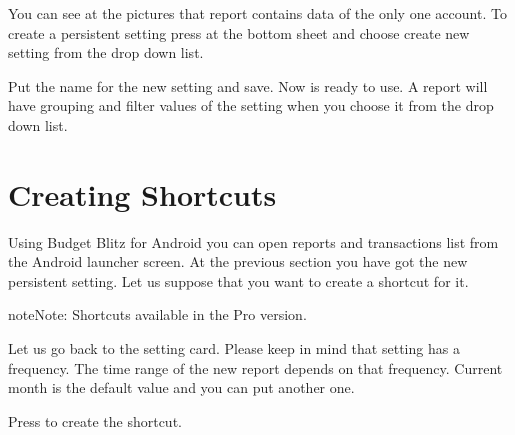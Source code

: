 \documentclass[a4paper,10pt,english]{sphinxmanual}
\begin{document}
\noindent{}
\noindent{}
\noindent{}

\sphinxAtStartPar
You can see at the pictures that report contains data of the only one account. To create
a persistent setting press  at the bottom sheet
and choose create new setting from the drop down list.

\noindent{}
\noindent{}
\noindent{}

\sphinxAtStartPar
Put the name  for the new setting and save. Now
 is ready to use. A report will have
grouping and filter values of the setting when you choose it from the
drop down list.

\noindent{}
\noindent{}


\section{Creating Shortcuts}
\label{\detokenize{shortcuts:creating-shortcuts}}
\sphinxAtStartPar
Using Budget Blitz for Android you can open reports and transactions list from the Android launcher screen. At the previous
section you have got the new persistent setting. Let us suppose that you want to create a shortcut for it.

\begin{sphinxadmonition}{note}{Note:}
\sphinxAtStartPar
Shortcuts available in the Pro version.
\end{sphinxadmonition}

\sphinxAtStartPar
Let us go back to the setting card. Please keep in mind that setting has a frequency. The time range of the
new report depends on that frequency. Current month is the default value and you can put another one.

\sphinxAtStartPar
Press  to create the shortcut.
\end{document}
